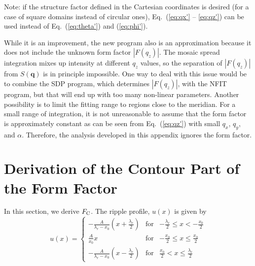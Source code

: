 Note: if the structure factor defined in the Cartesian coordinates is desired
(for a case of square domains instead of circular ones),
Eq.~(\ref{eq:qx'} -- \ref{eq:qz'}) can be used instead of 
Eq.~(\ref{eq:theta'}) and (\ref{eq:phi'}).

While it is an improvement, the new program also is an approximation because 
it does not include the unknown form factor $|F(q_z)|$. 
The mosaic spread integration mixes up intensity at different $q_z$ values, so
the separation of $|F(q_z)|$ from $S(\mathbf{q})$ is in principle impossible. 
One way to deal with this issue would be to combine the SDP program, 
which determines $|F(q_z)|$, with the NFIT program, but
that will end up with too many non-linear parameters.
Another possibility is to limit the fitting range to regions close to the meridian.
For a small range of integration, it is not unreasonable to assume that
the form factor is approximately constant as can be seen from 
Eq.~(\ref{eq:qz'}) with small $q_x$, $q_y$, and $\alpha$. 
Therefore, the analysis developed in this appendix ignores the form factor.

\newpage
\section{Derivation of the Contour Part of the Form Factor}\label{app:FC}
In this section, we derive $F_\mathrm{C}$. The ripple profile, $u(x)$ is given by
\begin{equation}
  u(x) = \left\{
    \begin{array}{ccc}
    -\frac{A}{\lambda_r-x_0}\left(x+\frac{\lambda_r}{2}\right) 
      & \text{for} 
      & -\frac{\lambda_r}{2} \leq x < -\frac{x_0}{2} \\
    \frac{A}{x_0}x 
      & \text{for} 
      & -\frac{x_0}{2} \leq x \leq \frac{x_0}{2} \\
    -\frac{A}{\lambda_r-x_0} \left(x-\frac{\lambda_r}{2}\right)
      & \text{for} 
      & \frac{x_0}{2} < x \leq \frac{\lambda_r}{2}
    \end{array} \right.
\end{equation}

